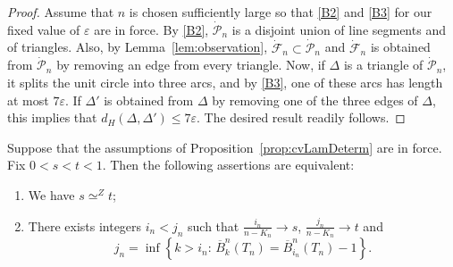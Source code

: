 \documentclass[AHL,XML,longabstracts,Unicode]{cedram}
\def\dFn{\dot{\mathcal{F}}_{n}}
\def\dPn{\dot{\mathcal{P}}_{n}}
\def\oB{\overline{B}}
\renewcommand{\epsilon}{\varepsilon}
\begin{document}
\begin{proof}
Assume that $n$ is chosen sufficiently large so that \ref{B2} and \ref{B3} for our fixed value of $\epsilon$ are in force.
By \ref{B2}, $ \dPn$ is a disjoint union of line segments and of triangles. Also, by Lemma~\ref{lem:observation}, $ \dFn \subset \dPn$ and  $\dFn$ is obtained from $\dPn$ by removing an edge from every triangle. Now, if $ \Delta$ is a triangle of $\dPn$, it splits the unit circle into three arcs, and by \ref{B3}, one of these arcs has length at most $7 \epsilon$. If $ {\Delta}'$ is obtained from $\Delta$ by removing one of the three edges of $\Delta$, this implies that $d_{H}(\Delta,{\Delta}') \leq 7 \epsilon$. The desired result readily follows.
\end{proof}



\begin{lemma}
\label{lem:approxJ1}
Suppose that the assumptions of Proposition~\ref{prop:cvLamDeterm} are in force. Fix $0<s<t < 1$.
Then the following assertions are equivalent:
\begin{enumerate}
\item[(i)] We have $s \simeq^Z t$;
\item[(ii)] There exists integers $i_{n}< j_{n}$ such that $ \tfrac{i_{n}}{n-K_{n}} \rightarrow s$, $ \tfrac{j_{n}}{n-K_{n}} \rightarrow t$ and
\[ j_{n}= \inf \left\{k>i_{n}: \,  \oB^{n}_k(T_n)=\oB^{n}_{i_{n}}(T_n)-1 \right\}.\]
\end{enumerate}
\end{lemma}
\end{document}

